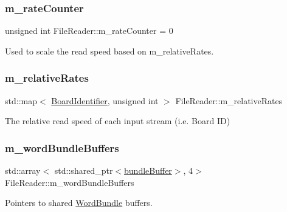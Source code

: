 \subsubsection{\texorpdfstring{m\+\_\+rate\+Counter}{m\_rateCounter}}
{\footnotesize\ttfamily unsigned int File\+Reader\+::m\+\_\+rate\+Counter = 0\hspace{0.3cm}{\ttfamily [private]}}



Used to scale the read speed based on m\+\_\+relative\+Rates. 

\mbox{\label{class_file_reader_ab00c6ff706d8cee9ee064f9cc3258d08}} 
\subsubsection{\texorpdfstring{m\+\_\+relative\+Rates}{m\_relativeRates}}
{\footnotesize\ttfamily std\+::map$<$ \hyperlink{class_board_identifier}{Board\+Identifier}, unsigned int $>$ File\+Reader\+::m\+\_\+relative\+Rates\hspace{0.3cm}{\ttfamily [private]}}



The relative read speed of each input stream (i.\+e. Board ID) 

\mbox{\label{class_file_reader_a038d1362d7e0458b3450ab8584eab688}} 
\subsubsection{\texorpdfstring{m\+\_\+word\+Bundle\+Buffers}{m\_wordBundleBuffers}}
{\footnotesize\ttfamily std\+::array$<$ std\+::shared\+\_\+ptr$<$\hyperlink{class_file_reader_ac755c1e271610c2c12a7fc5b55cc048b}{bundle\+Buffer}$>$, 4$>$ File\+Reader\+::m\+\_\+word\+Bundle\+Buffers\hspace{0.3cm}{\ttfamily [private]}}



Pointers to shared \hyperlink{class_word_bundle}{Word\+Bundle} buffers. 

\mbox{\label{class_file_reader_a44215632cb0ae7ee51991eb3213d03bf}} 
